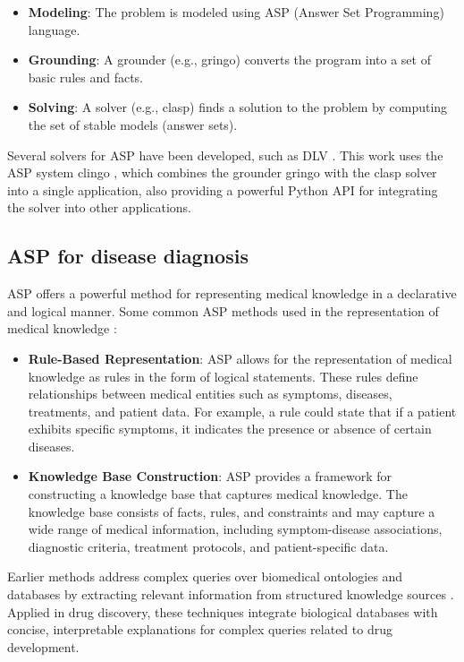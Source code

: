 \documentclass[10pt,leqno]{amsart}
\begin{document}
\begin{itemize}
    \item \textbf{Modeling}: The problem is modeled using ASP (Answer Set Programming) language.
    \item \textbf{Grounding}: A grounder (e.g., gringo) converts the program into a set of basic rules and facts.
    \item \textbf{Solving}: A solver (e.g., clasp) finds a solution to the problem by computing the set of stable models (answer sets).
\end{itemize}

Several solvers for ASP have been developed, such as DLV \cite{Xia2020}. 
This work uses the ASP system clingo \cite{Gebser2014}, 
which combines the grounder gringo with the clasp solver \cite{Holldobler2014} 
into a single application, also providing a powerful Python API for integrating the solver into other applications.

\subsection{ASP for disease diagnosis}
ASP offers a powerful method for representing medical knowledge in a declarative and logical manner. 
Some common ASP methods used in the representation of medical knowledge \cite{Vinarti2019}:

\begin{itemize}
    \item \textbf{Rule-Based Representation}: ASP allows for the representation of medical knowledge as rules in the form of logical statements. These rules define relationships between medical entities such as symptoms, diseases, treatments, and patient data. For example, a rule could state that if a patient exhibits specific symptoms, it indicates the presence or absence of certain diseases.
    \item \textbf{Knowledge Base Construction}: ASP provides a framework for constructing a knowledge base that captures medical knowledge. The knowledge base consists of facts, rules, and constraints and may capture a wide range of medical information, including symptom-disease associations, diagnostic criteria, treatment protocols, and patient-specific data.
\end{itemize}

Earlier methods address complex queries over biomedical ontologies 
and databases by extracting relevant information from structured 
knowledge sources \cite{Erdem2011}. Applied in drug discovery, 
these techniques integrate biological databases with concise, 
interpretable explanations for complex queries related to drug development.
\end{document}
